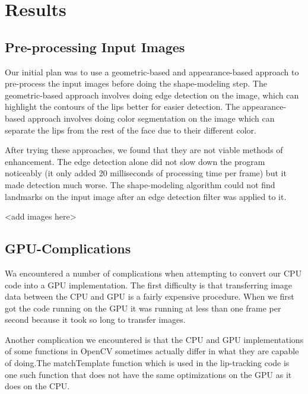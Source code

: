 \chapter{Results}

\section{Pre-processing Input Images}
Our initial plan was to use a geometric-based and appearance-based approach to pre-process the input images before doing the shape-modeling step. The geometric-based approach involves doing edge detection on the image, which can highlight the contours of the lips better for easier detection. The appearance-based approach involves doing color segmentation on the image which can separate the lips from the rest of the face due to their different color. 

After trying these approaches, we found that they are not viable methods of enhancement. The edge detection alone did not slow down the program noticeably (it only added 20 milliseconds of processing time per frame) but it made detection much worse. The shape-modeling algorithm could not find landmarks on the input image after an edge detection filter was applied to it. 



<add images here>

\section{GPU-Complications}

Wa encountered a number of complications when attempting to convert our CPU code into a GPU implementation. The first difficulty is that transferring image data between the CPU and GPU is a fairly expensive procedure. When we first got the code running on the GPU it was running at less than one frame per second because it took so long to transfer images.

Another complication we encountered is that the CPU and GPU implementations of some functions in OpenCV sometimes actually differ in what they are capable of doing.The matchTemplate function which is used in the lip-tracking code is one such function that does not have the same optimizations on the GPU as it does on the CPU. 